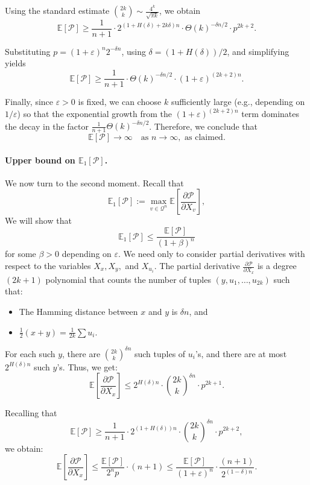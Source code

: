 \documentclass[11pt]{article}
\theoremstyle{definition}
\theoremstyle{plain}
\begin{document}
Using the standard estimate \( \binom{2k}{k} \sim \frac{4^k}{\sqrt{\pi k}} \), we obtain
\[
\mathbb{E}[\mathcal{P}]  \geq  \frac{1}{n+1} \cdot 2^{(1 + H(\delta) + 2k\delta)n} \cdot \Theta(k)^{-\delta n/2} \cdot p^{2k+2}.
\]

Substituting \( p = (1 + \varepsilon)^n  2^{-\delta n} \), using $\delta = (1 + H(\delta))/2$, and simplifying yields
\[
\mathbb{E}[\mathcal{P}]  \geq \frac{1}{n+1} \cdot \Theta(k)^{-\delta n/2} \cdot (1 + \varepsilon)^{(2k + 2)n} .
\]

Finally, since \( \varepsilon > 0 \) is fixed, we can choose \( k \) sufficiently large (e.g., depending on \( 1/\varepsilon \)) so that the exponential growth from the \( (1 + \varepsilon)^{(2k+2)n} \) term dominates the decay in the factor $ \frac{1}{n+1} \Theta(k)^{-\delta n/2}$. Therefore, we conclude that
\[
\mathbb{E}[\mathcal{P}] \to \infty \quad \text{as } n \to \infty, \text{ as claimed.}
\]
\paragraph{{\bf Upper bound on \( \mathbb{E}_1[\mathcal{P}] \).}}
We now turn to the second moment. Recall that
\[
\mathbb{E}_1[\mathcal{P}] := \max_{v \in \mathcal{Q}^n} \mathbb{E}\left[\frac{\partial \mathcal{P}}{\partial X_v}\right],
\]
 We will show that
\[
\mathbb{E}_1[\mathcal{P}] \leq \frac{\mathbb{E}[\mathcal{P}]}{(1 + \beta)^n}
\]
for some \( \beta > 0 \) depending on \( \varepsilon \).
 We need only to consider partial derivatives with respect to the variables \(X_x, X_y, \) and \(X_{u_i}\).
 The partial derivative \( \frac{\partial \mathcal{P}}{\partial X_x} \) is a degree \( (2k+1) \) polynomial that counts the number of tuples \( (y, u_1, \ldots, u_{2k}) \) such that:
\begin{itemize}
    \item The Hamming distance between $x$ and $y$ is \(\delta n \), and
    \item \( \frac{1}{2}(x + y) = \frac{1}{2k} \sum u_i \).
\end{itemize}

For each such \( y \), there are \( \binom{2k}{k}^{\delta n} \) such tuples of \( u_i \)'s, and there are at most \( 2^{H(\delta)n} \) such \( y \)'s. Thus, we get:
\[
\mathbb{E}\left[\frac{\partial \mathcal{P}}{\partial X_x}\right] \leq 2^{H(\delta)n} \cdot \binom{2k}{k}^{\delta n} \cdot p^{2k+1}.
\]

Recalling that
\[
\mathbb{E}[\mathcal{P}] \geq \frac{1}{n+1}\cdot 2^{(1 + H(\delta))n} \cdot \binom{2k}{k}^{\delta n} \cdot p^{2k+2},
\]
we obtain:
\[
\mathbb{E}\left[\frac{\partial \mathcal{P}}{\partial X_x}\right] \leq \frac{\mathbb{E}[\mathcal{P}]}{2^n p} \cdot (n+1) \leq  \frac{\mathbb{E}[\mathcal{P}]}{(1+\varepsilon)^n}  \cdot\frac{(n+1)}{2^{(1-\delta)n}}   .
\]
\end{document}
